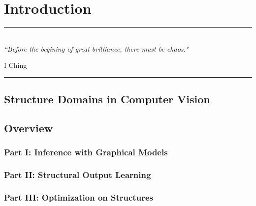 
\chapter{Introduction} %
\label{Chapter1} %

\rule{\textwidth}{0.4pt} \\[0.5cm]
\textit{``Before the begining of great brilliance, there must be chaos."}

\begin{flushright}
I Ching
\end{flushright}
\rule{\textwidth}{0.4pt} 




\section{Structure Domains in Computer Vision}



\section{Overview}
\subsection{Part I: Inference with Graphical Models}
\subsection{Part II: Structural Output Learning}
\subsection{Part III: Optimization on Structures}
